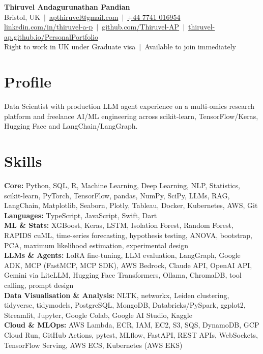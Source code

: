 \documentclass[a4paper,11pt]{article}
\begin{document}
\fontsize{11}{13.2}\selectfont

\begin{center}
  {\LARGE\bfseries Thiruvel Andagurunathan Pandian}\\[3pt]
  Bristol, UK \,$|$\, \href{mailto:apthiruvel@gmail.com}{apthiruvel@gmail.com} \,$|$\, \href{tel:+447741016954}{+44 7741 016954}\\[1pt]
\href{https://www.linkedin.com/in/thiruvel-a-p/}{linkedin.com/in/thiruvel-a-p} \,$|$\, \href{https://github.com/Thiruvel-AP}{github.com/Thiruvel-AP} \,$|$\, \href{https://thiruvel-ap.github.io/PersonalPortfolio/}{thiruvel-ap.github.io/PersonalPortfolio}\\[1pt]
  Right to work in UK under Graduate visa \,$|$\, Available to join immediately
\end{center}

\section{Profile}
Data Scientist with production LLM agent experience on a multi-omics research platform and freelance AI/ML engineering across scikit-learn, TensorFlow/Keras, Hugging Face and LangChain/LangGraph.

\section{Skills}
\textbf{Core:} Python, SQL, R, Machine Learning, Deep Learning, NLP, Statistics, scikit-learn, PyTorch, TensorFlow, pandas, NumPy, SciPy, LLMs, RAG, LangChain, Matplotlib, Seaborn, Plotly, Tableau, Docker, Kubernetes, AWS, Git\\[2pt]
\textbf{Languages:} TypeScript, JavaScript, Swift, Dart\\[2pt]
\textbf{ML \& Stats:} XGBoost, Keras, LSTM, Isolation Forest, Random Forest, RAPIDS cuML, time-series forecasting, hypothesis testing, ANOVA, bootstrap, PCA, maximum likelihood estimation, experimental design\\[2pt]
\textbf{LLMs \& Agents:} LoRA fine-tuning, LLM evaluation, LangGraph, Google ADK, MCP (FastMCP, MCP SDK), AWS Bedrock, Claude API, OpenAI API, Gemini via LiteLLM, Hugging Face Transformers, Ollama, ChromaDB, tool calling, prompt design\\[2pt]
\textbf{Data Visualisation \& Analysis:} NLTK, networkx, Leiden clustering, tidyverse, tidymodels, PostgreSQL, MongoDB, Databricks/PySpark, ggplot2, Streamlit, Jupyter, Google Colab, Google AI Studio, Kaggle\\[2pt]
\textbf{Cloud \& MLOps:} AWS Lambda, ECR, IAM, EC2, S3, SQS, DynamoDB, GCP Cloud Run, GitHub Actions, pytest, MLflow, FastAPI, REST APIs, WebSockets, TensorFlow Serving, AWS ECS, Kubernetes (AWS EKS)
\end{document}
